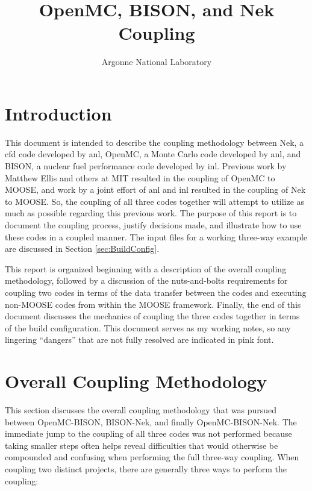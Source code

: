 \documentclass[10pt]{article}
\numberwithin{equation}{section} %
\begin{document}
\title{OpenMC, BISON, and Nek Coupling}
\author{Argonne National Laboratory}
\maketitle

\tableofcontents

\clearpage

\section{Introduction}

This document is intended to describe the coupling methodology between Nek, a \gls{cfd} code developed by \gls{anl}, OpenMC, a Monte Carlo code developed by \gls{anl}, and BISON, a nuclear fuel performance code developed by \gls{inl}. Previous work by Matthew Ellis and others at MIT resulted in the coupling of OpenMC to MOOSE, and work by a joint effort of \gls{anl} and \gls{inl} resulted in the coupling of Nek to MOOSE. So, the coupling of all three codes together will attempt to utilize as much as possible regarding this previous work. The purpose of this report is to document the coupling process, justify decisions made, and illustrate how to use these codes in a coupled manner. The input files for a working three-way example are discussed in Section \ref{sec:BuildConfig}.

This report is organized beginning with a description of the overall coupling methodology, followed by a discussion of the nuts-and-bolts requirements for coupling two codes in terms of the data transfer between the codes and executing non-MOOSE codes from within the MOOSE framework. Finally, the end of this document discusses the mechanics of coupling the three codes together in terms of the build configuration. This document serves as my working notes, so any lingering ``dangers'' that are not fully resolved are indicated in pink font.

\clearpage
\section{Overall Coupling Methodology}
This section discusses the overall coupling methodology that was pursued between OpenMC-BISON, BISON-Nek, and finally OpenMC-BISON-Nek. The immediate jump to the coupling of all three codes was not performed because taking smaller steps often helps reveal difficulties that would otherwise be compounded and confusing when performing the full three-way coupling. When coupling two distinct projects, there are generally three ways to perform the coupling:
\end{document}
